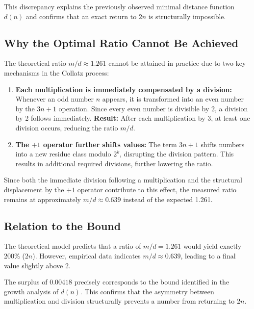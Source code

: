 \documentclass[a4paper,12pt]{article}
\begin{document}
This discrepancy explains the previously observed minimal distance function \( d(n) \) and confirms that an exact return to \( 2n \) is structurally impossible.  

\subsection{Why the Optimal Ratio Cannot Be Achieved}  

The theoretical ratio \( m/d \approx 1.261 \) cannot be attained in practice due to two key mechanisms in the Collatz process:

\begin{enumerate}
    \item \textbf{Each multiplication is immediately compensated by a division:}  
    Whenever an odd number \( n \) appears, it is transformed into an even number by the \( 3n+1 \) operation. Since every even number is divisible by 2, a division by 2 follows immediately.  
    \textbf{Result:} After each multiplication by 3, at least one division occurs, reducing the ratio \( m/d \).

    \item \textbf{The \( +1 \) operator further shifts values:}  
    The term \( 3n+1 \) shifts numbers into a new residue class modulo \( 2^k \), disrupting the division pattern. This results in additional required divisions, further lowering the ratio.
\end{enumerate}

Since both the immediate division following a multiplication and the structural displacement by the \( +1 \) operator contribute to this effect, the measured ratio remains at approximately \( m/d \approx 0.639 \) instead of the expected 1.261.  

\subsection{Relation to the Bound}  

The theoretical model predicts that a ratio of \( m/d = 1.261 \) would yield exactly 200\% (\( 2n \)).  
However, empirical data indicates \( m/d \approx 0.639 \), leading to a final value slightly above 2.  

The surplus of \( 0.00418 \) precisely corresponds to the bound identified in the growth analysis of \( d(n) \). This confirms that the asymmetry between multiplication and division structurally prevents a number from returning to \( 2n \).  
\end{document}
